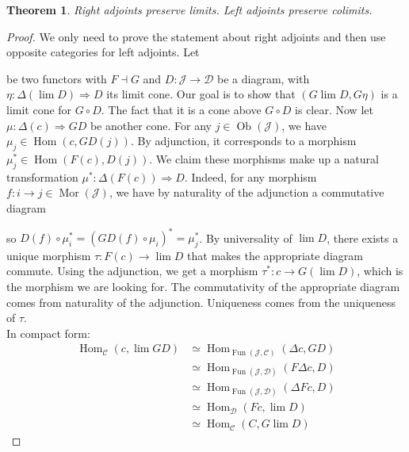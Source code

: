 \documentclass{article}
\newcommand{\cat}{\mathcal{C}}
\newcommand{\catt}{\mathcal{D}}
\newcommand{\Jcat}{\mathcal{J}}
\DeclareMathOperator{\Ob}{Ob}
\DeclareMathOperator{\Mor}{Mor}
\DeclareMathOperator{\Hom}{Hom}
\DeclareMathOperator{\Fun}{Fun}
\theoremstyle{plain}
\newtheorem{theorem}{Theorem}[section]
\theoremstyle{definition}
\theoremstyle{remark}
\begin{document}
\begin{theorem}
    Right adjoints preserve limits. Left adjoints preserve colimits.
\end{theorem}

\begin{proof}
    We only need to prove the statement about right adjoints and then use opposite categories for left adjoints. Let  be two functors with $F \dashv G$ and $D : \Jcat \to \catt$ be a diagram, with $\eta : \Delta(\lim D) \Rightarrow D$ its limit cone. Our goal is to show that $(G\lim D,G\eta)$ is a limit cone for $G\circ D$. The fact that it is a cone above $G \circ D$ is clear. Now let $\mu : \Delta(c) \Rightarrow GD$ be another cone. For any $j \in \Ob(\Jcat)$, we have $\mu_j \in \Hom(c,GD(j))$. By adjunction, it corresponds to a morphism $\mu_j^* \in \Hom(F(c),D(j))$. We claim these morphisms make up a natural transformation $\mu^* : \Delta(F(c)) \Rightarrow D$. Indeed, for any morphism $f : i \to j \in \Mor(\Jcat)$, we have by naturality of the adjunction a commutative diagram
    \begin{center}
    \end{center}
    so $D(f) \circ \mu_i^* = (GD(f)\circ \mu_i)^* = \mu_j^*$. By universality of $\lim D$, there exists a unique morphism $\tau : F(c) \to \lim D$ that makes the appropriate diagram commute. Using the adjunction, we get a morphism $\tau^* : c \to G(\lim D)$, which is the morphism we are looking for. The commutativity of the appropriate diagram comes from naturality of the adjunction. Uniqueness comes from the uniqueness of $\tau$. \\
    In compact form:
    \begin{align*}
        \Hom_\cat (c,\lim GD) & \simeq \Hom_{\Fun(\Jcat,\cat)} (\Delta c,GD) \\
        & \simeq \Hom_{\Fun(\Jcat,\catt)}(F\Delta c,D) \\
        & \simeq \Hom_{\Fun(\Jcat,\catt)}(\Delta F c,D) \\
        & \simeq \Hom_\catt (Fc, \lim D) \\
        & \simeq \Hom_\cat (C,G \lim D)
    \end{align*}
\end{proof}
\newpage
\end{document}
